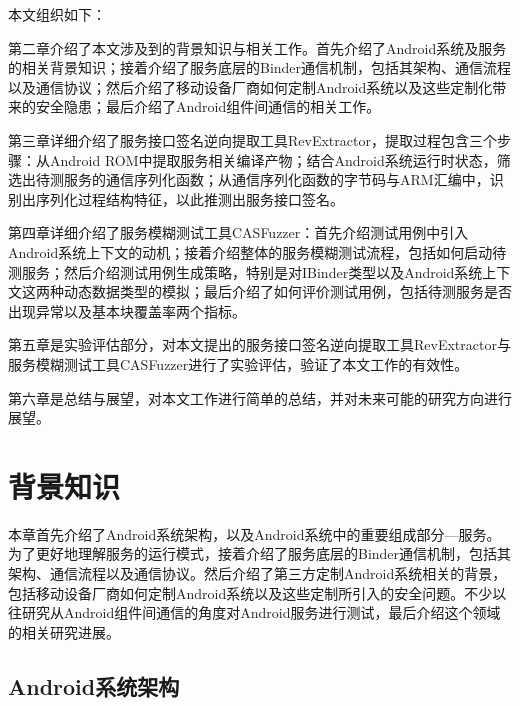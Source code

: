 \documentclass[winfonts,master,twoside]{njuthesis}
\begin{document}
本文组织如下：

第二章介绍了本文涉及到的背景知识与相关工作。首先介绍了Android系统及服务的相关背景知识；接着介绍了服务底层的Binder通信机制，包括其架构、通信流程以及通信协议；然后介绍了移动设备厂商如何定制Android系统以及这些定制化带来的安全隐患；最后介绍了Android组件间通信的相关工作。

第三章详细介绍了服务接口签名逆向提取工具RevExtractor，提取过程包含三个步骤：从Android ROM中提取服务相关编译产物；结合Android系统运行时状态，筛选出待测服务的通信序列化函数；从通信序列化函数的字节码与ARM汇编中，识别出序列化过程结构特征，以此推测出服务接口签名。

第四章详细介绍了服务模糊测试工具CASFuzzer：首先介绍测试用例中引入Android系统上下文的动机；接着介绍整体的服务模糊测试流程，包括如何启动待测服务；然后介绍测试用例生成策略，特别是对IBinder类型以及Android系统上下文这两种动态数据类型的模拟；最后介绍了如何评价测试用例，包括待测服务是否出现异常以及基本块覆盖率两个指标。

第五章是实验评估部分，对本文提出的服务接口签名逆向提取工具RevExtractor与服务模糊测试工具CASFuzzer进行了实验评估，验证了本文工作的有效性。

第六章是总结与展望，对本文工作进行简单的总结，并对未来可能的研究方向进行展望。

\chapter{背景知识}

本章首先介绍了Android系统架构，以及Android系统中的重要组成部分—服务。为了更好地理解服务的运行模式，接着介绍了服务底层的Binder通信机制，包括其架构、通信流程以及通信协议。然后介绍了第三方定制Android系统相关的背景，包括移动设备厂商如何定制Android系统以及这些定制所引入的安全问题。不少以往研究从Android组件间通信的角度对Android服务进行测试，最后介绍这个领域的相关研究进展。

\section{Android系统架构}
\end{document}
